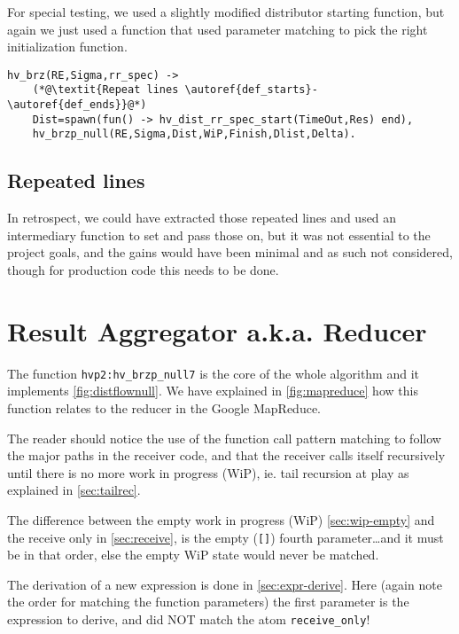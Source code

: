 For special testing, we used a slightly modified distributor starting
function, but again we just used a function that used parameter
matching to pick the right initialization function. 
\begin{lstlisting}[name=hvp2]
%Specialized one with only two named receivers using the RoundRobin method 
hv_brz(RE,Sigma,rr_spec) ->
	(*@\textit{Repeat lines \autoref{def_starts}-\autoref{def_ends}}@*)
	Dist=spawn(fun() -> hv_dist_rr_spec_start(TimeOut,Res) end),
	hv_brzp_null(RE,Sigma,Dist,WiP,Finish,Dlist,Delta).
\end{lstlisting}



\subsection{Repeated lines}

In retrospect, we could have extracted those repeated lines and used an
intermediary function to set and pass those on, but it was not
essential to the project goals, and the gains would have been minimal
and as such not considered, though for production code this needs to
be done.



\section{Result Aggregator a.k.a. Reducer}
\label{sec:proc_receiver}

The function \texttt{hvp2:hv\_brzp\_null\/7} is the core of the whole
algorithm and it implements \autoref{fig:distflownull}. We have
explained in \autoref{fig:mapreduce} how this function relates to the
reducer in the Google MapReduce.

 The reader should notice the use of the
function call pattern matching to follow the major paths in the
receiver code, and that the receiver calls itself recursively until
there is no more work in progress (WiP), ie. tail recursion at play as
explained in \autoref{sec:tailrec}.

The difference between the empty work in progress (WiP)
\autoref{sec:wip-empty} and the receive only in \autoref{sec:receive},
is the empty (\texttt{[]}) fourth parameter\ldots and it must be in
that order, else the empty WiP state would never be matched.

The derivation of a new expression is done in
\autoref{sec:expr-derive}. Here (again note the order for matching the
function parameters) the first parameter is the expression to derive,
and did NOT match the atom \texttt{receive\_only}!

